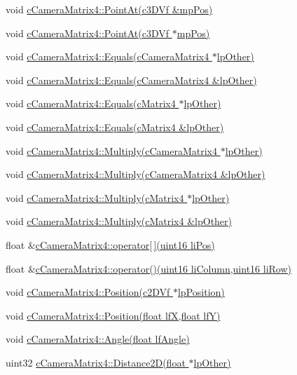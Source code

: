  void \hyperlink{classc_camera_matrix4_ac9e73a11692a91065a59af310e8e246b}{cCameraMatrix4::PointAt(c3DVf \&mpPos)} \par
 void \hyperlink{classc_camera_matrix4_aee6a49404715d0a891f7e59c0124fc16}{cCameraMatrix4::PointAt(c3DVf $\ast$mpPos)} \par
 \par
 void \hyperlink{classc_camera_matrix4_ac22d068fd30bfd2c5cb23dc06822f500}{cCameraMatrix4::Equals(cCameraMatrix4 $\ast$lpOther)} \par
 void \hyperlink{classc_camera_matrix4_a6ef73d4d654a0dcf9ffc146908bd88ed}{cCameraMatrix4::Equals(cCameraMatrix4 \&lpOther)} \par
 void \hyperlink{classc_camera_matrix4_ab6b4ff506c700a7e209dae84eb52d4ef}{cCameraMatrix4::Equals(cMatrix4 $\ast$lpOther)} \par
 void \hyperlink{classc_camera_matrix4_a21037a9e876362aea2c9461f38e50304}{cCameraMatrix4::Equals(cMatrix4 \&lpOther)} \par
 \par
 void \hyperlink{classc_camera_matrix4_a3856050392bac0f5391a280acc7e1f45}{cCameraMatrix4::Multiply(cCameraMatrix4 $\ast$lpOther)} \par
 void \hyperlink{classc_camera_matrix4_a7a539cb44fa348ad19408ddcb928c49c}{cCameraMatrix4::Multiply(cCameraMatrix4 \&lpOther)} \par
 void \hyperlink{classc_camera_matrix4_a7d72fd4af4f6c427a71e7084a10ca1b3}{cCameraMatrix4::Multiply(cMatrix4 $\ast$lpOther)} \par
 void \hyperlink{classc_camera_matrix4_a81a6d3f77fb020b58ea788b42f581905}{cCameraMatrix4::Multiply(cMatrix4 \&lpOther)} \par
 \par
 float \&\hyperlink{classc_camera_matrix4_ad9cd70439ad670a7ecc0e9198b5e0516}{cCameraMatrix4::operator\mbox{[}$\,$\mbox{]}(uint16 liPos)} \par
 float \&\hyperlink{classc_camera_matrix4_a47de224c654b31aa8c22e55ec1d58ed0}{cCameraMatrix4::operator()(uint16 liColumn,uint16 liRow)} \par
 \par
 void \hyperlink{classc_camera_matrix4_a62fa2879539cc733e661d02b8a898578}{cCameraMatrix4::Position(c2DVf $\ast$lpPosition)} \par
 void \hyperlink{classc_camera_matrix4_a293ac7d2919eae7205b568ea56fa104c}{cCameraMatrix4::Position(float lfX,float lfY)} \par
 void \hyperlink{classc_camera_matrix4_a6be0f1f82cc4ee5a5953cb3b569b4285}{cCameraMatrix4::Angle(float lfAngle)} \par
 uint32 \hyperlink{classc_camera_matrix4_a02c68197ed3c64c95985269f5b9f66a4}{cCameraMatrix4::Distance2D(float $\ast$lpOther)} \par


